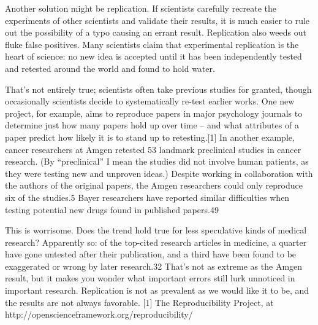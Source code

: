 Another solution might be replication. If scientists carefully recreate the experiments of other scientists and validate their results, it is much easier to rule out the possibility of a typo causing an errant result. Replication also weeds out fluke false positives. Many scientists claim that experimental replication is the heart of science: no new idea is accepted until it has been independently tested and retested around the world and found to hold water.

That’s not entirely true; scientists often take previous studies for granted, though occasionally scientists decide to systematically re-test earlier works. One new project, for example, aims to reproduce papers in major psychology journals to determine just how many papers hold up over time – and what attributes of a paper predict how likely it is to stand up to retesting.[1] In another example, cancer researchers at Amgen retested 53 landmark preclinical studies in cancer research. (By “preclinical” I mean the studies did not involve human patients, as they were testing new and unproven ideas.) Despite working in collaboration with the authors of the original papers, the Amgen researchers could only reproduce six of the studies.5 Bayer researchers have reported similar difficulties when testing potential new drugs found in published papers.49

This is worrisome. Does the trend hold true for less speculative kinds of medical research? Apparently so: of the top-cited research articles in medicine, a quarter have gone untested after their publication, and a third have been found to be exaggerated or wrong by later research.32 That’s not as extreme as the Amgen result, but it makes you wonder what important errors still lurk unnoticed in important research. Replication is not as prevalent as we would like it to be, and the results are not always favorable.
[1]	The Reproducibility Project, at http://openscienceframework.org/reproducibility/
